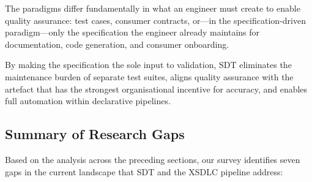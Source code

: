 The paradigms differ fundamentally in what an engineer must create to enable quality assurance: test cases, consumer contracts, or---in the specification-driven paradigm---only the specification the engineer already maintains for documentation, code generation, and consumer onboarding.

By making the specification the sole input to validation, SDT eliminates the maintenance burden of separate test suites, aligns quality assurance with the artefact that has the strongest organisational incentive for accuracy, and enables full automation within declarative pipelines.

\subsection{Summary of Research Gaps}
\label{subsec:research-gaps}

Based on the analysis across the preceding sections, our survey identifies seven gaps in the current landscape that SDT and the XSDLC pipeline address:

